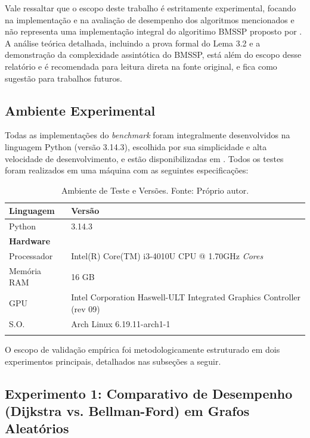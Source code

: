 \documentclass[10pt,a4paper]{article}
\begin{document}
Vale ressaltar que o escopo deste trabalho é estritamente experimental, focando na implementação e na avaliação de desempenho dos algoritmos mencionados e não representa uma implementação integral do algoritimo BMSSP proposto por \cite{breakingTheSortingBarrier}. A análise teórica detalhada, incluindo a prova formal do Lema 3.2 e a demonstração da complexidade assintótica do BMSSP, está além do escopo desse relatório e é recomendada para leitura direta na fonte original, e fica como sugestão para trabalhos futuros.

\subsection{Ambiente Experimental}

Todas as implementações do \textit{benchmark} foram integralmente desenvolvidos na linguagem Python (versão 3.14.3), escolhida por sua simplicidade e alta velocidade de desenvolvimento, e estão disponibilizadas em \citep{ribas2026sssp}.
Todos os testes foram realizados em uma máquina com as seguintes especificações:
\begin{table}[h]
\centering
\caption{Ambiente de Teste e Versões. Fonte: Próprio autor.}\label{tab:ambiente_teste}
\begin{tabular}{l l}
\hline
\textbf{Linguagem} & \textbf{Versão} \\
\hline
Python & 3.14.3 \\
\hline
\multicolumn{2}{l}{\textbf{Hardware}} \\
\hline
Processador & Intel(R) Core(TM) i3-4010U CPU @ 1.70GHz \textit{Cores} \\
Memória RAM & 16 GB \\
GPU & Intel Corporation Haswell-ULT Integrated Graphics Controller (rev 09)\\
S.O. & Arch Linux 6.19.11-arch1-1 \\
\hline
\label{tab:ambiente_teste}
\end{tabular}
\end{table}

O escopo de validação empírica foi metodologicamente estruturado em dois experimentos principais, detalhados nas subseções a seguir.

\subsection{Experimento 1: Comparativo de Desempenho (Dijkstra vs. Bellman-Ford) em Grafos Aleatórios}
\end{document}
